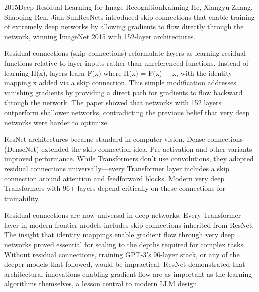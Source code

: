 
\begin{papersummary}{2015}{Deep Residual Learning for Image Recognition}{Kaiming He, Xiangyu Zhang, Shaoqing Ren, Jian Sun}{ResNets introduced skip connections that enable training of extremely deep networks by allowing gradients to flow directly through the network, winning ImageNet 2015 with 152-layer architectures.}

Residual connections (skip connections) reformulate layers as learning residual functions relative to layer inputs rather than unreferenced functions. Instead of learning H(x), layers learn F(x) where H(x) = F(x) + x, with the identity mapping x added via a skip connection. This simple modification addresses vanishing gradients by providing a direct path for gradients to flow backward through the network. The paper showed that networks with 152 layers outperform shallower networks, contradicting the previous belief that very deep networks were harder to optimize.

ResNet architectures became standard in computer vision. Dense connections (DenseNet) extended the skip connection idea. Pre-activation and other variants improved performance. While Transformers don't use convolutions, they adopted residual connections universally—every Transformer layer includes a skip connection around attention and feedforward blocks. Modern very deep Transformers with 96+ layers depend critically on these connections for trainability.

Residual connections are now universal in deep networks. Every Transformer layer in modern frontier models includes skip connections inherited from ResNet. The insight that identity mappings enable gradient flow through very deep networks proved essential for scaling to the depths required for complex tasks. Without residual connections, training GPT-3's 96-layer stack, or any of the deeper models that followed, would be impractical. ResNet demonstrated that architectural innovations enabling gradient flow are as important as the learning algorithms themselves, a lesson central to modern LLM design.

\end{papersummary}
